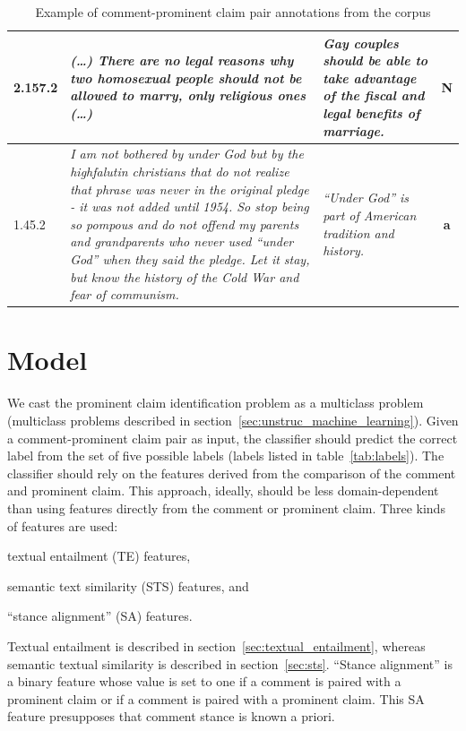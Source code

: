 \begin{table}[t!]
{\begin{tabular}{@{}lp{9.5cm}p{3.5cm}c@{}}
\midrule
2.157.2 & \normalsize{%
\textit{
(\dots) There are no legal reasons why two homosexual people should not be
allowed to marry, only religious ones (\dots)
}
} & \normalsize{%
\textit{
Gay couples should be able to take advantage of the fiscal and legal benefits
of marriage.
}
} & \textbf{N} \\
\midrule
1.45.2 & \normalsize{%
\textit{
 I am not bothered by under God but by the highfalutin christians that do not
 realize that phrase was never in the original pledge - it was not added until
 1954. So stop being so pompous and do not offend my parents and grandparents
 who never used ``under God'' when they said the pledge. Let it stay, but know
 the history of the Cold War and fear of communism.
 }} & 
 \normalsize{
 \textit{
 ``Under God'' is part of American tradition and history.
 }} & \textbf{a}  \\
\bottomrule
\end{tabular}
}
\caption{Example of comment-prominent claim pair annotations from the \ComArg corpus}
\label{tab:comarg}
\end{table}


\section{Model}
\label{sec:argrec_model}

We cast the prominent claim identification problem as a multiclass problem
(multiclass problems described in section~\ref{sec:unstruc_machine_learning}). 
Given a comment-prominent claim pair as input, the classifier should
predict the correct label from the set of five possible labels (labels
listed in table~\ref{tab:labels}). 
The classifier should rely on the features derived from the comparison
of the comment and prominent claim. 
This approach, ideally, should be less domain-dependent than using features
directly from the comment or prominent claim. 
Three kinds of features are used: 
\begin{enumerate*}[label=(\arabic*)]
\item textual entailment (TE) features, 
\item semantic text similarity (STS) features, and
\item ``stance alignment'' (SA) features. 
\end{enumerate*}
Textual entailment is described in section~\ref{sec:textual_entailment}, whereas
semantic textual similarity is described in section~\ref{sec:sts}. 
``Stance alignment'' is a binary feature whose value is set to one if a
 comment is paired with a  prominent claim or if a
 comment is paired with a  prominent claim. This SA
feature presupposes that comment stance is known a priori.

